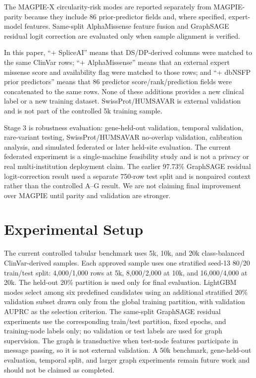 \documentclass[conference]{IEEEtran}
\begin{document}
The MAGPIE-X circularity-risk modes are reported separately from MAGPIE-parity because they include 86 prior-predictor fields and, where specified, expert-model features. Same-split AlphaMissense feature fusion and GraphSAGE residual logit correction are evaluated only when sample alignment is verified.

In this paper, ``+ SpliceAI'' means that DS/DP-derived columns were matched to the same ClinVar rows; ``+ AlphaMissense'' means that an external expert missense score and availability flag were matched to those rows; and ``+ dbNSFP prior predictors'' means that 86 predictor score/rank/prediction fields were concatenated to the same rows. None of these additions provides a new clinical label or a new training dataset. SwissProt/HUMSAVAR is external validation and is not part of the controlled 5k training sample.

Stage 3 is robustness evaluation: gene-held-out validation, temporal validation, rare-variant testing, SwissProt/HUMSAVAR no-overlap validation, calibration analysis, and simulated federated or later held-site evaluation. The current federated experiment is a single-machine feasibility study and is not a privacy or real multi-institution deployment claim. The earlier 97.73\% GraphSAGE residual logit-correction result used a separate 750-row test split and is nonpaired context rather than the controlled A--G result. We are not claiming final improvement over MAGPIE until parity and validation are stronger.

\section{Experimental Setup}
The current controlled tabular benchmark uses 5k, 10k, and 20k class-balanced ClinVar-derived samples. Each approved sample uses one stratified seed-13 80/20 train/test split: 4,000/1,000 rows at 5k, 8,000/2,000 at 10k, and 16,000/4,000 at 20k. The held-out 20\% partition is used only for final evaluation. LightGBM modes select among six predefined candidates using an additional stratified 20\% validation subset drawn only from the global training partition, with validation AUPRC as the selection criterion. The same-split GraphSAGE residual experiments use the corresponding train/test partition, fixed epochs, and training-node labels only; no validation or test labels are used for graph supervision. The graph is transductive when test-node features participate in message passing, so it is not external validation. A 50k benchmark, gene-held-out evaluation, temporal split, and larger graph experiments remain future work and should not be claimed as completed.
\end{document}
